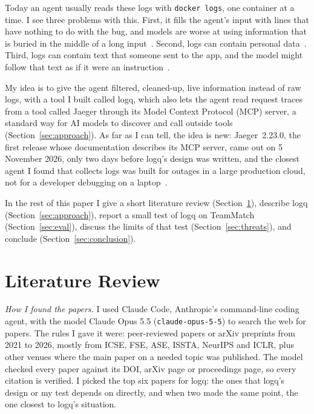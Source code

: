 \documentclass[10pt,conference]{IEEEtran}
\newcommand{\cmd}[1]{\texttt{#1}}
\begin{document}
Today an agent usually reads these logs with \cmd{docker logs}, one container at a time. I see three problems with this. First, it fills the agent's input with lines that have nothing to do with the bug, and models are worse at using information that is buried in the middle of a long input~\cite{liu2024lostmiddle}. Second, logs can contain personal data~\cite{aghili2025logprivacy}. Third, logs can contain text that someone sent to the app, and the model might follow that text as if it were an instruction~\cite{greshake2023injection}.

My idea is to give the agent filtered, cleaned-up, live information instead of raw logs, with a tool I built called logq, which also lets the agent read request traces from a tool called Jaeger through its Model Context Protocol (MCP) server, a standard way for AI models to discover and call outside tools (Section~\ref{sec:approach}). As far as I can tell, the idea is new: Jaeger~2.23.0, the first release whose documentation describes its MCP server, came out on 5 November 2026, only two days before logq's design was written, and the closest agent I found that collects logs was built for outages in a large production cloud, not for a developer debugging on a laptop~\cite{roy2024rcaagents}.

In the rest of this paper I give a short literature review (Section~\ref{sec:related}), describe logq (Section~\ref{sec:approach}), report a small test of logq on TeamMatch (Section~\ref{sec:eval}), discuss the limits of that test (Section~\ref{sec:threats}), and conclude (Section~\ref{sec:conclusion}).

\section{Literature Review}\label{sec:related}

\emph{How I found the papers.} I used Claude Code, Anthropic's command-line coding agent, with the model Claude Opus 5.5 (\cmd{claude-opus-5-5}) to search the web for papers. The rules I gave it were: peer-reviewed papers or arXiv preprints from 2021 to 2026, mostly from ICSE, FSE, ASE, ISSTA, NeurIPS and ICLR, plus other venues where the main paper on a needed topic was published. The model checked every paper against its DOI, arXiv page or proceedings page, so every citation is verified. I picked the top six papers for logq: the ones that logq's design or my test depends on directly, and when two made the same point, the one closest to logq's situation.
\end{document}
